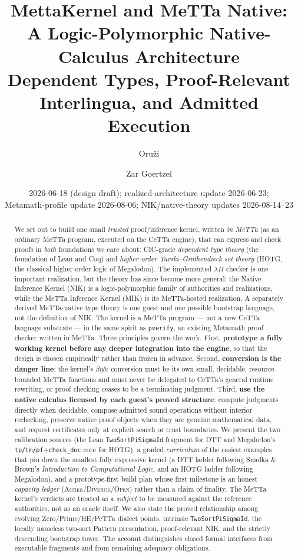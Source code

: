 \documentclass[11pt]{article}
\title{MettaKernel and MeTTa Native:\\
A Logic-Polymorphic Native-Calculus Architecture\\
\large Dependent Types, Proof-Relevant Interlingua, and Admitted Execution}
\author{Oru\v{z}i \and Zar Goertzel}
\date{2026-06-18 (design draft); realized-architecture update 2026-06-23;\\ Metamath-profile update 2026-08-06; NIK/native-theory updates 2026-08-14--23}
\newcommand{\MeTTa}{MeTTa}
\newcommand{\CeTTa}{CeTTa}
\newcommand{\HOTG}{HOTG}
\newcommand{\DTT}{DTT}
\newcommand{\NIK}{NIK}
\newcommand{\MIK}{MIK}
\newcommand{\code}[1]{\texttt{#1}}
\begin{document}
\maketitle

\begin{abstract}
We set out to build one small \emph{trusted} proof/inference kernel, written
\emph{in \MeTTa{}} (as an ordinary \MeTTa{} program, executed on the \CeTTa{}
engine), that can express and check proofs in \emph{both} foundations we care
about: CIC-grade \emph{dependent type theory} (the foundation of Lean and Coq)
and \emph{higher-order Tarski--Grothendieck set theory} (\HOTG{}, the classical
higher-order logic of Megalodon). The implemented $\lambda\Pi$ checker is one
important realization, but the theory has since become more general: the Native
Inference Kernel (\NIK{}) is a logic-polymorphic family of authorities and
realizations, while the MeTTa Inference Kernel (\MIK{}) is its MeTTa-hosted
realization.  A separately derived MeTTa-native type theory is one guest and one
possible bootstrap language, not the definition of \NIK{}.  The kernel is a
\MeTTa{} program --- not a new \CeTTa{} language substrate --- in the same spirit
as \code{pverify}, an existing Metamath proof checker written in \MeTTa{}. Three
principles govern the work.
First, \textbf{prototype a fully working kernel before any deeper integration into
the engine}, so that the design is chosen empirically rather than frozen in
advance. Second, \textbf{conversion is the danger line}: the kernel's
$\beta\eta\delta\iota$ conversion must be its own small, decidable, resource-bounded
\MeTTa{} functions and must never be delegated to \CeTTa{}'s general runtime
rewriting, or proof checking ceases to be a terminating judgment. Third,
\textbf{use the native calculus licensed by each guest's proved structure}:
compute judgments directly when decidable, compose admitted sound operations
without interior rechecking, preserve native proof objects when they are genuine
mathematical data, and request certificates only at explicit search or trust
boundaries. We present the
two calibration sources (the Lean \code{TwoSortPiSigmaId} fragment for \DTT{} and
Megalodon's \code{tp/tm/pf}+\code{check\_doc} core for \HOTG{}), a graded
\emph{curriculum} of the easiest examples that pin down the smallest fully
expressive kernel (a \DTT{} ladder following Smolka \& Brown's \emph{Introduction
to Computational Logic}, and an \HOTG{} ladder following Megalodon), and a
prototype-first build plan whose first milestone is an honest \emph{capacity ledger}
(\textsc{Agree}/\textsc{Diverge}/\textsc{Open}) rather than a claim of finality. The
\MeTTa{} kernel's verdicts are treated as a \emph{subject} to be measured against
the reference authorities, not as an oracle itself.  We also state the proved
relationship among evolving Zero/Prime/HE/PeTTa dialect points, intrinsic
\code{TwoSortPiSigmaId}, the locally nameless two-sort Pattern presentation, proof-relevant
\NIK{}, and the strictly descending bootstrap tower.  The account distinguishes
closed formal interfaces from executable fragments and from remaining adequacy
obligations.
\end{abstract}
\end{document}

